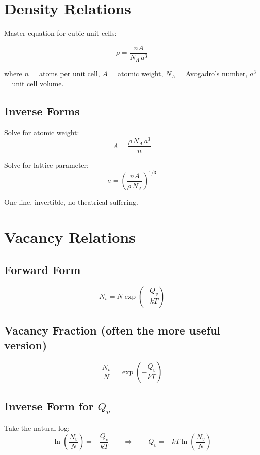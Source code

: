 \documentclass[11pt, letterpaper]{article}
\newcommand{\NA}{N_{\!A}}
\newcommand{\Qv}{Q_v}
\newcommand{\Nv}{N_v}
\begin{document}
\section{Density Relations}

Master equation for cubic unit cells:

\[
\boxed{\rho = \frac{n A}{\NA\, a^3}}
\]

\noindent
where $n$ = atoms per unit cell, $A$ = atomic weight, $\NA$ = Avogadro's number,
$a^3$ = unit cell volume.

\subsection{Inverse Forms}

Solve for atomic weight:
\[
A = \frac{\rho\, \NA\, a^3}{n}
\]

Solve for lattice parameter:
\[
a = \left(\frac{n A}{\rho\, \NA}\right)^{1/3}
\]

One line, invertible, no theatrical suffering.

\section{Vacancy Relations}

\subsection{Forward Form}

\[
\Nv = N\exp\!\left(-\frac{\Qv}{kT}\right)
\]

\subsection{Vacancy Fraction (often the more useful version)}

\[
\frac{\Nv}{N} = \exp\!\left(-\frac{\Qv}{kT}\right)
\]

\subsection{Inverse Form for $\Qv$}

Take the natural log:
\[
\ln\!\left(\frac{\Nv}{N}\right) = -\frac{\Qv}{kT}
\qquad\Longrightarrow\qquad
\Qv = -kT\ln\!\left(\frac{\Nv}{N}\right)
\]
\end{document}
